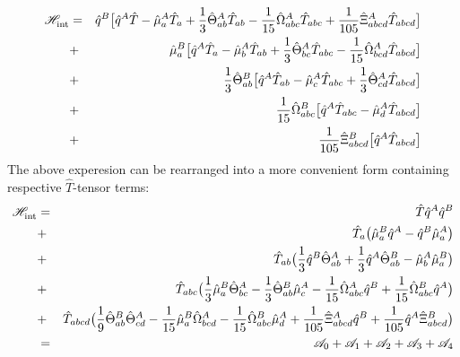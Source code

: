 \documentclass[a4paper,titlepage,twoside,fleqn]{article}
\begin{document}
\begin{eqnarray}
\mathscr{H}_{\rm int}^{\rm} 
&=& \hat{q}^B \big[ 
                 \hat{q}^A\hat{T} - 
                 \hat{\mu}^A_a\hat{T}_a + 
                 \frac{1}{3} \hat{\Theta}^A_{ab}\hat{T}_{ab} -
                 \frac{1}{15} \hat{\Omega}^A_{abc} \hat{T}_{abc} + 
                 \frac{1}{105} \hat{\Xi}^A_{abcd} \hat{T}_{abcd} 
              \big] \\ \nonumber
&+& \hat{\mu}^B_a \big[  
                      \hat{q}^A\hat{T}_a - 
                      \hat{\mu}^A_b\hat{T}_{ab} +  
                      \frac{1}{3} \hat{\Theta}^A_{bc}\hat{T}_{abc} -  
                      \frac{1}{15} \hat{\Omega}^A_{bcd} \hat{T}_{abcd} 
                  \big] \\ \nonumber
&+& \frac{1}{3}\hat{\Theta}^B_{ab} \big[ 
                                          \hat{q}^A\hat{T}_{ab} - 
                                          \hat{\mu}^A_c\hat{T}_{abc} + 
                                          \frac{1}{3} \hat{\Theta}^A_{cd}\hat{T}_{abcd} 
                                   \big] \\ \nonumber
&+& \frac{1}{15}\hat{\Omega}^B_{abc} \big[ 
                                            \hat{q}^A\hat{T}_{abc} - 
                                            \hat{\mu}^A_d\hat{T}_{abcd} 
                                     \big] \\ \nonumber
&+& \frac{1}{105}\hat{\Xi}^B_{abcd} \big[ 
                                           \hat{q}^A\hat{T}_{abcd}  
                                    \big] 
\end{eqnarray}
The above experesion can be rearranged into a more convenient form 
containing respective $\hat{T}$-tensor terms:
\begin{eqnarray}\label{e:mtp}
\mathscr{H}_{\rm int}^{\rm} 
&=& \hat{T} \hat{q}^A \hat{q}^B \\ \nonumber
&+& \hat{T}_a \big(
                     \hat{\mu}^B_a \hat{q}^A -
                     \hat{q}^B \hat{\mu}^A_a 
              \big) \\ \nonumber
&+& \hat{T}_{ab} \big( 
                       \frac{1}{3} \hat{q}^B \hat{\Theta}^A_{ab} + 
                       \frac{1}{3} \hat{q}^A \hat{\Theta}^B_{ab} - 
                       \hat{\mu}_b^A \hat{\mu}_a^B 
                 \big)\\ \nonumber
&+& \hat{T}_{abc} \big( \frac{1}{3} \hat{\mu}_a^B \hat{\Theta}^A_{bc} - 
                        \frac{1}{3} \hat{\Theta}^B_{ab} \hat{\mu}_c^A -
                        \frac{1}{15} \hat{\Omega}^A_{abc} \hat{q}^B +
                        \frac{1}{15} \hat{\Omega}^B_{abc} \hat{q}^A 
                   \big)\\ \nonumber
&+& \hat{T}_{abcd} \big( 
                        \frac{1}{9} \hat{\Theta}^B_{ab} \hat{\Theta}^A_{cd} - 
                        \frac{1}{15} \hat{\mu}_a^B \hat{\Omega}^A_{bcd} -
                        \frac{1}{15} \hat{\Omega}^B_{abc} \hat{\mu}_d^A +
                        \frac{1}{105} \hat{\Xi}^A_{abcd} \hat{q}^B + 
                        \frac{1}{105} \hat{q}^A \hat{\Xi}^B_{abcd} 
                   \big)\\ \nonumber
&=& \mathscr{A}_0 + \mathscr{A}_1 + \mathscr{A}_2 + \mathscr{A}_3 + \mathscr{A}_4
\end{eqnarray}
\end{document}
